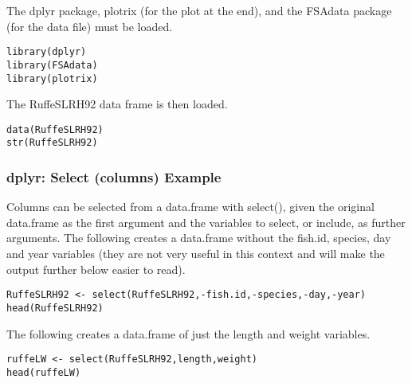 \begin{frame}[verbatim]
The dplyr package, plotrix (for the plot at the end), and the FSAdata package (for the data file) must be loaded.
\begin{framed}
\begin{verbatim}
library(dplyr)
library(FSAdata)
library(plotrix)
\end{verbatim}
\end{framed}

\end{frame}
\begin{frame}[verbatim]
The RuffeSLRH92 data frame is then loaded.

\begin{framed}
\begin{verbatim}
data(RuffeSLRH92)
str(RuffeSLRH92)
\end{verbatim}
\end{framed}

\end{frame}
\begin{frame}[verbatim]
\frametitle{dplyr: Select (columns) Example}
Columns can be selected from a data.frame with select(), given the original data.frame as the first argument and the variables to select, or include, as further arguments. The following creates a data.frame without the fish.id, species, day and year variables (they are not very useful in this context and will make the output further below easier to read).
\begin{framed}
\begin{verbatim}
RuffeSLRH92 <- select(RuffeSLRH92,-fish.id,-species,-day,-year)
head(RuffeSLRH92)
\end{verbatim}
\end{framed}

\end{frame}
\begin{frame}[verbatim]

The following creates a data.frame of just the length and weight variables.

\begin{framed}
\begin{verbatim}
ruffeLW <- select(RuffeSLRH92,length,weight)
head(ruffeLW)

\end{verbatim}
\end{framed}

\end{frame}

